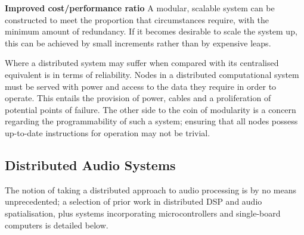 \textbf{Improved cost/performance ratio}
A modular, scalable system can be constructed to meet the proportion that
circumstances require, with the minimum amount of redundancy.
If it becomes desirable to scale the system up, this can be achieved by small
increments rather than by expensive leaps.


Where a distributed system may suffer when compared with its centralised
equivalent is in terms of reliability.
Nodes in a distributed computational system must be served with power and access
to the data they require in order to operate.
This entails the provision of power, cables and a proliferation of potential
points of failure.
The other side to the coin of modularity is a concern regarding the
programmability of such a system;
ensuring that all nodes possess up-to-date instructions for operation may not be
trivial.

\subsection{Distributed Audio Systems}\label{subsec:distributed-audio-systems}

The notion of taking a distributed approach to audio processing is by no means
unprecedented;
a selection of prior work in distributed DSP and audio spatialisation, plus
systems incorporating microcontrollers and single-board computers is detailed
below.

